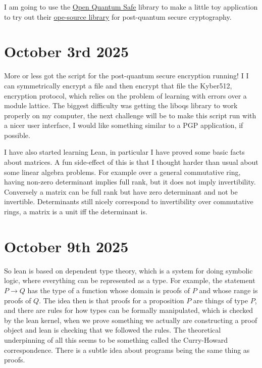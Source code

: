 \documentclass{amsart}
\theoremstyle{definition}
\begin{document}
I am going to use the \href{https://openquantumsafe.org/about/}{Open Quantum Safe} library to make a little toy application to try out their \href{https://github.com/open-quantum-safe/liboqs}{ope-source library} for post-quantum secure cryptography.

\section{October 3rd 2025}

More or less got the script for the post-quantum secure encryption running! I I can symmetrically encrypt a file and then encrypt that file the Kyber512, encryption protocol, which relies on the problem of learning with errors over a module lattice. The biggest difficulty was getting the liboqs library to work properly on my computer, the next challenge will be to make this script run with a nicer user interface, I would like something similar to a PGP application, if possible.

I have also started learning Lean, in particular I have proved some basic facts about matrices. A fun side-effect of this is that I thought harder than usual about some linear algebra problems. For example over a general commutative ring, having non-zero determinant implies full rank, but it does not imply invertibility. Conversely a matrix can be full rank but have zero determinant and not be invertible. Determinants still nicely correspond to invertibility over commutative rings,  a matrix is a unit iff the determinant is.

\section{October 9th 2025}

So lean is based on dependent type theory, which is a system for doing symbolic logic, where everything can be represented as a type. For example, the statement $P\rightarrow Q$ has the type of a function whose domain is proofs of $P$ and whose range is proofs of $Q$. The idea then is that proofs for a proposition $P$ are things of type $P$, and there are rules for how types can be formally manipulated, which is checked by the lean kernel, when we prove something we actually are constructing a proof object and lean is checking that we followed the rules. The theoretical underpinning of all this seems to be something called the Curry-Howard correspondence. There is a subtle idea about programs being the same thing as proofs.
\end{document}
